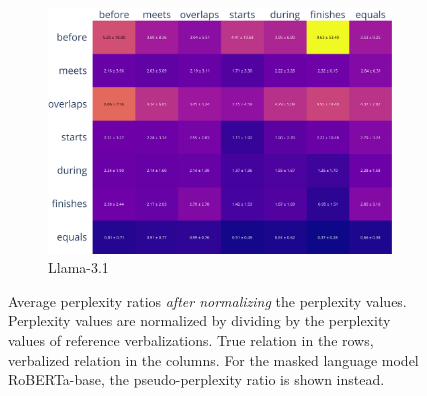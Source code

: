 \documentclass[11pt]{article}
\begin{document}
\begin{figure}
    \vspace{1em}

    \begin{subfigure}[b]{0.95\textwidth}
      \centering
      \includegraphics[width=0.95\columnwidth, height=0.3\textheight, keepaspectratio, valign=c]{../plots/meta-llama-3-1-8b_confusion_matrix_values_normalized.pdf}
      \caption{Llama-3.1}
    \end{subfigure}
  \caption{Average perplexity ratios \textit{after normalizing} the perplexity values. Perplexity values are normalized by dividing by the perplexity values of reference verbalizations. True relation in the rows, verbalized relation in the columns. For the masked language model RoBERTa-base, the pseudo-perplexity ratio is shown instead.}
  \label{fig:confusion_matrix_values_normalized}
\end{figure}
\end{document}
